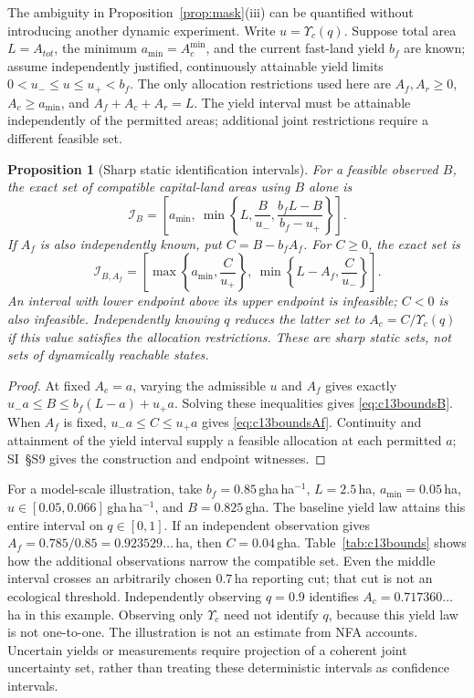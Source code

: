 \documentclass[preprint,12pt,authoryear]{elsarticle}
\newtheorem{proposition}{Proposition}
\newcommand{\Ups}{\Upsilon_c}
\newcommand{\Acmin}{A_c^{\min}}
\begin{document}
The ambiguity in Proposition~\ref{prop:mask}(iii) can be quantified without introducing another dynamic experiment. Write $u=\Ups(q)$. Suppose total area $L=A_{tot}$, the minimum $a_{\min}=\Acmin$, and the current fast-land yield $b_f$ are known; assume independently justified, continuously attainable yield limits $0<u_-\le u\le u_+<b_f$. The only allocation restrictions used here are $A_f,A_r\ge0$, $A_c\ge a_{\min}$, and $A_f+A_c+A_r=L$. The yield interval must be attainable independently of the permitted areas; additional joint restrictions require a different feasible set.

\begin{proposition}[Sharp static identification intervals]\label{prop:c13ident}
For a feasible observed $B$, the exact set of compatible capital-land areas using $B$ alone is
\begin{equation}\label{eq:c13boundsB}
\mathcal I_B=\left[a_{\min},\ \min\left\{L,\frac{B}{u_-},\frac{b_fL-B}{b_f-u_+}\right\}\right].
\end{equation}
If $A_f$ is also independently known, put $C=B-b_fA_f$. For $C\ge0$, the exact set is
\begin{equation}\label{eq:c13boundsAf}
\mathcal I_{B,A_f}=\left[\max\left\{a_{\min},\frac{C}{u_+}\right\},\ \min\left\{L-A_f,\frac{C}{u_-}\right\}\right].
\end{equation}
An interval with lower endpoint above its upper endpoint is infeasible; $C<0$ is also infeasible. Independently knowing $q$ reduces the latter set to $A_c=C/\Ups(q)$ if this value satisfies the allocation restrictions. These are sharp static sets, not sets of dynamically reachable states.
\end{proposition}
\begin{proof}
At fixed $A_c=a$, varying the admissible $u$ and $A_f$ gives exactly $u_-a\le B\le b_f(L-a)+u_+a$. Solving these inequalities gives \eqref{eq:c13boundsB}. When $A_f$ is fixed, $u_-a\le C\le u_+a$ gives \eqref{eq:c13boundsAf}. Continuity and attainment of the yield interval supply a feasible allocation at each permitted $a$; SI~\S S9 gives the construction and endpoint witnesses.
\end{proof}

For a model-scale illustration, take $b_f=0.85$\,gha\,ha$^{-1}$, $L=2.5$\,ha, $a_{\min}=0.05$\,ha, $u\in[0.05,0.066]$\,gha\,ha$^{-1}$, and $B=0.825$\,gha. The baseline yield law attains this entire interval on $q\in[0,1]$. If an independent observation gives $A_f=0.785/0.85=0.923529\ldots$\,ha, then $C=0.04$\,gha. Table~\ref{tab:c13bounds} shows how the additional observations narrow the compatible set. Even the middle interval crosses an arbitrarily chosen $0.7$\,ha reporting cut; that cut is not an ecological threshold. Independently observing $q=0.9$ identifies $A_c=0.717360\ldots$\,ha in this example. Observing only $\Ups$ need not identify $q$, because this yield law is not one-to-one. The illustration is not an estimate from NFA accounts. Uncertain yields or measurements require projection of a coherent joint uncertainty set, rather than treating these deterministic intervals as confidence intervals.
\end{document}
